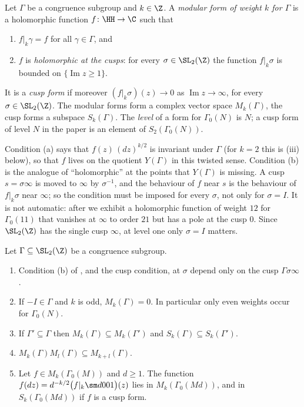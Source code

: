 \begin{definition}\label{def:modforms:modular-form}
Let $\Gamma$ be a congruence subgroup and $k\in\Z$. A \emph{modular form of weight $k$ for $\Gamma$} is a holomorphic function $f\colon\HH\to\C$ such that
\begin{enumerate}[label=(\alph*)]
\item $f|_k\gamma=f$ for all $\gamma\in\Gamma$, and
\item $f$ is \emph{holomorphic at the cusps}: for every $\sigma\in\SL_2(\Z)$ the function $f|_k\sigma$ is bounded on $\{\operatorname{Im}z\ge1\}$.
\end{enumerate}
It is a \emph{cusp form} if moreover $(f|_k\sigma)(z)\to0$ as $\operatorname{Im}z\to\infty$, for every $\sigma\in\SL_2(\Z)$. The modular forms form a complex vector space $M_k(\Gamma)$,
the cusp forms a subspace $S_k(\Gamma)$. The \emph{level} of a form for $\Gamma_0(N)$ is $N$; a cusp form of level $N$ in the paper is an element of $S_2(\Gamma_0(N))$.
\end{definition}

Condition (a) says that $f(z)\,(dz)^{k/2}$ is invariant under $\Gamma$ (for $k=2$ this is (iii) below), so that $f$ lives on the quotient $Y(\Gamma)$ in this twisted
sense. Condition (b) is the analogue of ``holomorphic'' at the points that $Y(\Gamma)$ is missing. A cusp $s=\sigma\infty$ is moved to $\infty$ by $\sigma^{-1}$, and the behaviour of $f$
near $s$ is the behaviour of $f|_k\sigma$ near $\infty$; so the condition must be imposed for every $\sigma$, not only for $\sigma=I$. It is not automatic: after
 we exhibit a holomorphic function of weight $12$ for $\Gamma_0(11)$ that vanishes at $\infty$ to order $21$ but has a pole at the cusp $0$. Since
$\SL_2(\Z)$ has the single cusp $\infty$, at level one only $\sigma=I$ matters.

\begin{proposition}\label{prop:modforms:mf-basic}
Let $\Gamma\subseteq\SL_2(\Z)$ be a congruence subgroup.
\begin{enumerate}[label=(\alph*)]
\item Condition (b) of , and the cusp condition, at $\sigma$ depend only on the cusp $\Gamma\sigma\infty$.
\item If $-I\in\Gamma$ and $k$ is odd, $M_k(\Gamma)=0$. In particular only even weights occur for $\Gamma_0(N)$.
\item If $\Gamma'\subseteq\Gamma$ then $M_k(\Gamma)\subseteq M_k(\Gamma')$ and $S_k(\Gamma)\subseteq S_k(\Gamma')$.
\item $M_k(\Gamma)M_l(\Gamma)\subseteq M_{k+l}(\Gamma)$.
\item Let $f\in M_k(\Gamma_0(M))$ and $d\ge1$. The function $f(dz)=d^{-k/2}\bigl(f|_k\sm d001\bigr)(z)$ lies in $M_k(\Gamma_0(Md))$, and in $S_k(\Gamma_0(Md))$ if $f$ is a cusp form.
\end{enumerate}
\end{proposition}

